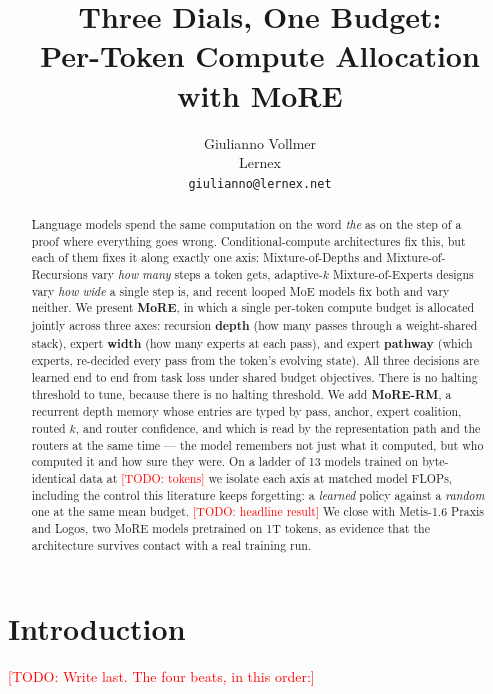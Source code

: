 \documentclass[11pt]{article}
\title{Three Dials, One Budget:\\Per-Token Compute Allocation with MoRE}
\author{Giulianno Vollmer\\Lernex\\\texttt{giulianno@lernex.net}}
\date{\TODO{date}}
\newcommand{\TODO}[1]{\textcolor{red}{[TODO: #1]}}
\begin{document}
\maketitle

\begin{abstract}
Language models spend the same computation on the word \emph{the} as on the step
of a proof where everything goes wrong. Conditional-compute architectures fix
this, but each of them fixes it along exactly one axis: Mixture-of-Depths and
Mixture-of-Recursions vary \emph{how many} steps a token gets, adaptive-$k$
Mixture-of-Experts designs vary \emph{how wide} a single step is, and recent
looped MoE models fix both and vary neither.
We present \textbf{MoRE}, in which a single per-token compute budget is allocated
jointly across three axes: recursion \textbf{depth} (how many passes through a
weight-shared stack), expert \textbf{width} (how many experts at each pass), and
expert \textbf{pathway} (which experts, re-decided every pass from the token's
evolving state). All three decisions are learned end to end from task loss under
shared budget objectives. There is no halting threshold to tune, because there is
no halting threshold.
We add \textbf{MoRE-RM}, a recurrent depth memory whose entries are typed by
pass, anchor, expert coalition, routed $k$, and router confidence, and which is
read by the representation path and the routers at the same time --- the model
remembers not just what it computed, but who computed it and how sure they were.
On a ladder of 13 models trained on byte-identical data at \TODO{tokens} we
isolate each axis at matched model FLOPs, including the control this
literature keeps forgetting: a \emph{learned} policy against a \emph{random} one
at the same mean budget. \TODO{headline result}
We close with Metis-1.6 Praxis and Logos, two MoRE models pretrained on 1T
tokens, as evidence that the architecture survives contact with a real training run.
\end{abstract}

\section{Introduction}

\TODO{Write last. The four beats, in this order:}
\end{document}
